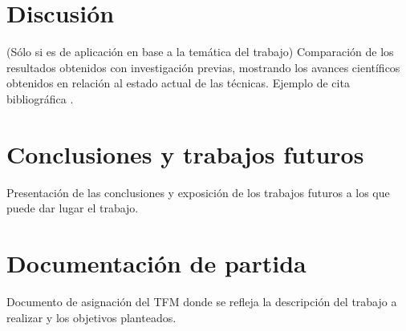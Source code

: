 \documentclass{Plantilla/Formato_EPEF}
\begin{document}
\newpage
\section{Discusión}
(Sólo si es de aplicación en  base a la temática del trabajo) Comparación de los resultados obtenidos con investigación previas, mostrando los avances científicos obtenidos en relación al estado actual de las técnicas. Ejemplo de cita bibliográfica \cite{ref:Hydrogen}.

\newpage
\section{Conclusiones y trabajos futuros}
Presentación de las conclusiones y exposición de los trabajos futuros a los que puede dar lugar el trabajo.

\newpage



\newpage
\section{Documentación de partida}
Documento de asignación del TFM donde se refleja la descripción del trabajo a realizar y los objetivos planteados.
\end{document}
